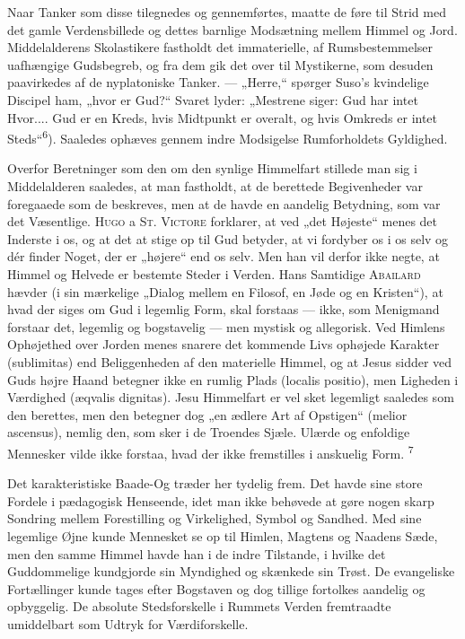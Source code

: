 \documentclass[12pt,a4paper,openany]{book}
\newcommand{\opage}[1]{\marginnote{\footnotesize\textit{[#1]}}}
\begin{document}
Naar Tanker som disse tilegnedes og gennemførtes, maatte de føre til
Strid med det gamle Verdensbillede og dettes barnlige Modsætning mellem
Himmel og Jord. Middelalderens Skolastikere fastholdt det immaterielle,
af Rumsbestemmelser uafhængige Gudsbegreb, og fra dem gik det over til
Mystikerne, som desuden paavirkedes af de nyplatoniske Tanker. ---
„Herre,“ spørger Suso’s kvindelige Discipel ham, „hvor er Gud?“ Svaret
lyder: „Mestrene siger: Gud har intet Hvor.... Gud er en Kreds, hvis
Midtpunkt er overalt, og hvis Omkreds er intet
Steds“\textsuperscript{6}). Saaledes ophæves gennem indre Modsigelse
Rumforholdets Gyldighed.

Overfor Beretninger som den om den synlige Himmelfart stillede man sig i
Middelalderen saaledes, at man fastholdt, at de berettede Begivenheder
var foregaaede som de beskreves, men at de havde en aandelig Betydning,
som var det Væsentlige. \textsc{Hugo} a \textsc{St. Victore} forklarer,
at ved „det Højeste“ menes det Inderste i os, og at det at stige op til
Gud betyder, at vi fordyber os i os selv og dér finder Noget, der er
„højere“ end os selv. Men han vil derfor ikke negte, at Himmel og
Helvede er bestemte Steder i Verden. Hans Samtidige \textsc{Abailard}
hævder (i sin mærkelige „Dialog mellem en Filosof, en Jøde og en
Kristen“), at hvad der siges om Gud i legemlig Form, skal forstaas ---
ikke, som Menigmand forstaar det, legemlig og bogstavelig --- men
mystisk og allegorisk. Ved Himlens Ophøjethed over Jorden menes snarere
det kommende Livs ophøjede Karakter (sublimitas) end Beliggenheden af
den materielle Himmel, og at Jesus sidder ved Guds højre Haand betegner
ikke en rumlig Plads (localis positio), men Ligheden i Værdighed
(æqvalis dignitas). Jesu Himmelfart er vel sket legemligt saaledes som
den berettes, men den betegner dog „en ædlere Art af Opstigen“ (melior
ascensus), nemlig den, som sker
\opage{28}i de Troendes Sjæle. Ulærde og enfoldige Mennesker vilde ikke
forstaa, hvad der ikke fremstilles i anskuelig Form. \textsuperscript{7}

Det karakteristiske Baade-Og træder her tydelig frem. Det havde sine
store Fordele i pædagogisk Henseende, idet man ikke behøvede at gøre
nogen skarp Sondring mellem Forestilling og Virkelighed, Symbol og
Sandhed. Med sine legemlige Øjne kunde Mennesket se op til Himlen,
Magtens og Naadens Sæde, men den samme Himmel havde han i de indre
Tilstande, i hvilke det Guddommelige kundgjorde sin Myndighed og
skænkede sin Trøst. De evangeliske Fortællinger kunde tages efter
Bogstaven og dog tillige fortolkes aandelig og opbyggelig. De absolute
Stedsforskelle i Rummets Verden fremtraadte umiddelbart som Udtryk for
Værdiforskelle.
\end{document}

